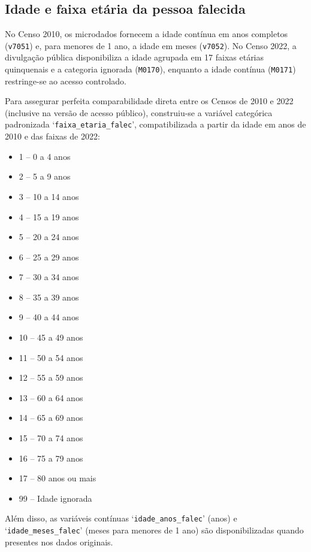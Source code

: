 \documentclass[12pt,a4paper]{article}
\newcommand{\vr}[1]{\texttt{#1}}
\begin{document}
\subsection{Idade e faixa etária da pessoa falecida}
No Censo 2010, os microdados fornecem a idade contínua em anos completos (\vr{v7051}) e, para menores de 1 ano, a idade em meses (\vr{v7052}). No Censo 2022, a divulgação pública disponibiliza a idade agrupada em 17 faixas etárias quinquenais e a categoria ignorada (\vr{M0170}), enquanto a idade contínua (\vr{M0171}) restringe-se ao acesso controlado.

Para assegurar perfeita comparabilidade direta entre os Censos de 2010 e 2022 (inclusive na versão de acesso público), construiu-se a variável categórica padronizada ‘\vr{faixa\_etaria\_falec}’, compatibilizada a partir da idade em anos de 2010 e das faixas de 2022:
\begin{itemize}
  \item 1 -- 0 a 4 anos
  \item 2 -- 5 a 9 anos
  \item 3 -- 10 a 14 anos
  \item 4 -- 15 a 19 anos
  \item 5 -- 20 a 24 anos
  \item 6 -- 25 a 29 anos
  \item 7 -- 30 a 34 anos
  \item 8 -- 35 a 39 anos
  \item 9 -- 40 a 44 anos
  \item 10 -- 45 a 49 anos
  \item 11 -- 50 a 54 anos
  \item 12 -- 55 a 59 anos
  \item 13 -- 60 a 64 anos
  \item 14 -- 65 a 69 anos
  \item 15 -- 70 a 74 anos
  \item 16 -- 75 a 79 anos
  \item 17 -- 80 anos ou mais
  \item 99 -- Idade ignorada
\end{itemize}
Além disso, as variáveis contínuas ‘\vr{idade\_anos\_falec}’ (anos) e ‘\vr{idade\_meses\_falec}’ (meses para menores de 1 ano) são disponibilizadas quando presentes nos dados originais.
\end{document}
